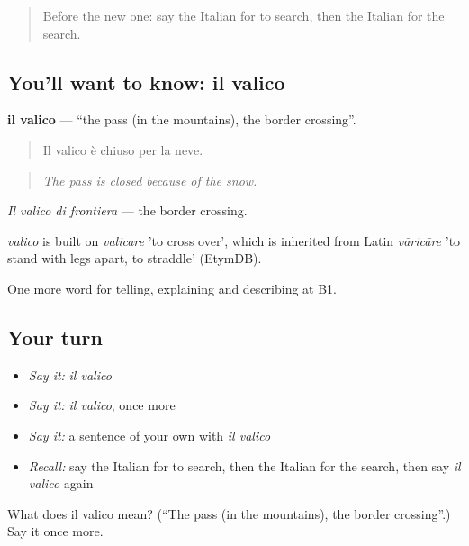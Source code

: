 \label{lesson:IT-C427-valico}



\begin{quote}
Before the new one: say the Italian for to search, then the Italian for the search.
\end{quote}

\subsection*{You'll want to know: il valico}
\textbf{il valico} — \textquotedblleft{}the pass (in the mountains), the border crossing\textquotedblright{}.

\begin{quote}
Il valico è chiuso per la neve.
\end{quote}

\begin{quote}
\emph{The pass is closed because of the snow.}
\end{quote}

\emph{Il valico di frontiera} — the border crossing.

\begin{cousinweb}
\emph{valico} is built on \emph{valicare} 'to cross over', which is inherited from Latin \emph{vāricāre} 'to stand with legs apart, to straddle' (EtymDB).
\end{cousinweb}

\begin{grammarlens}[title={What you've built}]
One more word for telling, explaining and describing at B1.
\end{grammarlens}

\subsection*{Your turn}
\begin{itemize}
\raggedright
  \item \emph{Say it:} \emph{il valico}
  \item \emph{Say it:} \emph{il valico}, once more
  \item \emph{Say it:} a sentence of your own with \emph{il valico}
  \item \emph{Recall:} say the Italian for to search, then the Italian for the search, then say \emph{il valico} again
\end{itemize}

\begin{tcolorbox}[breakable,colback=teal!4,colframe=teal!35!black,title={Before you move on}]
What does il valico mean? (\textquotedblleft{}The pass (in the mountains), the border crossing\textquotedblright{}.) Say it once more.
\end{tcolorbox}

